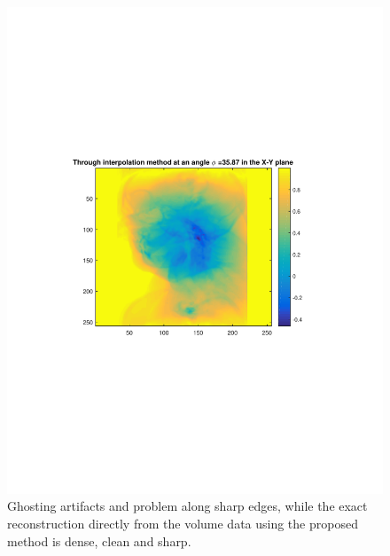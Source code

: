 \documentclass{UCF_ETD}
\begin{document}
\begin{figure}[H]
\begin{center}
\includegraphics[scale=0.5]{FVR/InterpolatedSliceColor}
\caption{Ghosting artifacts and problem along sharp edges, while the exact reconstruction directly from the volume data using the proposed method is dense, clean and sharp.}
\label{SimpleDemo2.fig}
\end{center}
\end{figure} 
\end{document}
